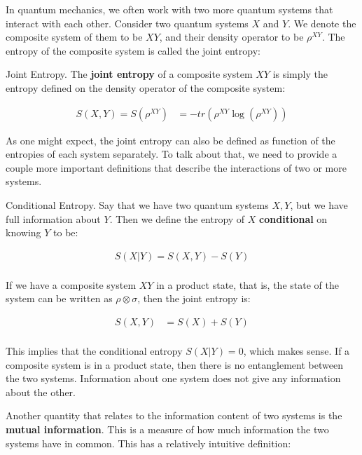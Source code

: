 In quantum mechanics, we often work with two more quantum systems that interact with each other. Consider two quantum systems $X$ and $Y$. We denote the composite system of them to be $XY$, and their density operator to be $\rho^{XY}$. The entropy of the composite system is called the joint entropy:

\begin{definition}{Joint Entropy.}
    The \textbf{joint entropy} of a composite system $XY$ is simply the entropy defined on the density operator of the composite system:
    
    \begin{align*}
        S(X,Y) = S(\rho^{XY}) &= -tr(\rho^{XY} \log(\rho^{XY}))
    \end{align*}
\end{definition}

As one might expect, the joint entropy can also be defined as function of the entropies of each system separately. To talk about that, we need to provide a couple more important definitions that describe the interactions of two or more systems.

\begin{definition}{Conditional Entropy.}
    Say that we have two quantum systems $X,Y$, but we have full information about $Y$. Then we define the entropy of $X$ \textbf{conditional} on knowing $Y$ to be: 
    
    \begin{align*}
        S(X|Y) = S(X,Y) - S(Y) \\
    \end{align*}
\end{definition}

\begin{example}
    If we have a composite system $XY$ in a product state, that is, the state of the system can be written as $\rho \otimes \sigma$, then the joint entropy is:
\end{example}

\begin{align*}
    S(X,Y) &= S(X) + S(Y) \\ 
\end{align*}

This implies that the conditional entropy $S(X|Y) = 0$, which makes sense. If a composite system is in a product state, then there is no entanglement between the two systems. Information about one system does not give any information about the other.

Another quantity that relates to the information content of two systems is the \textbf{mutual information}. This is a measure of how much information the two systems have in common. This has a relatively intuitive definition:

